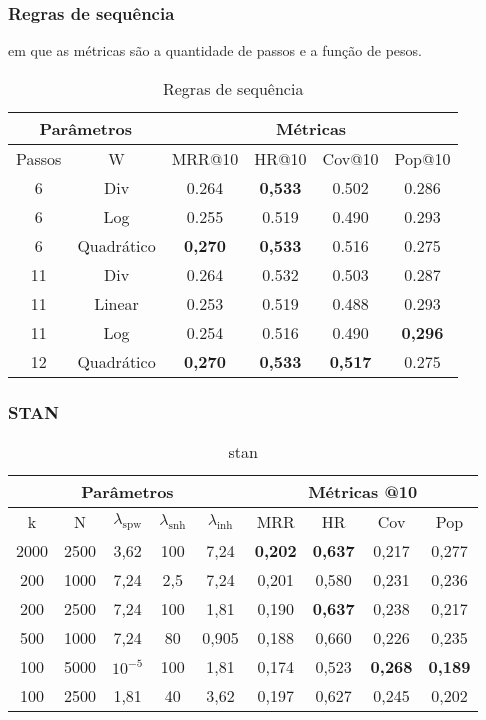 \subsubsection{Regras de sequência}
em que as métricas são a quantidade de passos e a função de pesos.
\begin{table}[htbp]
    \centering
    \begin{tabular}{|c|c|c|c|c|c|}
        \hline
        \multicolumn{2}{|c|}{Parâmetros} & \multicolumn{4}{c|}{Métricas} \\
        \hline
        Passos & W & MRR@10 & HR@10 & Cov@10 & Pop@10 \\
        \hline
        6 & Div & 0.264 & \textbf{0,533} & 0.502 & 0.286 \\
        \hline
        6 & Log & 0.255 & 0.519 & 0.490 & 0.293 \\
        \hline
        6 & Quadrático & \textbf{0,270} & \textbf{0,533} & 0.516 & 0.275 \\
        \hline
        11 & Div & 0.264 & 0.532 & 0.503 & 0.287 \\
        \hline
        11 & Linear & 0.253 & 0.519 & 0.488 & 0.293 \\
        \hline
        11 & Log & 0.254 & 0.516 & 0.490 & \textbf{0,296} \\
        \hline
        12 & Quadrático & \textbf{0,270} & \textbf{0,533} & \textbf{0,517} & 0.275 \\
        \hline
        \end{tabular}
    \caption{Regras de sequência}
\end{table}


\subsubsection{STAN}
\begin{table}[htbp]
    \centering
    \begin{tabular}{|c|c|c|c|c|c|c|c|c|}
      \hline
      \multicolumn{5}{|c|}{Parâmetros} & \multicolumn{4}{c|}{Métricas @10} \\
      \hline
      k & N & $\lambda_{\text{spw}}$ & $\lambda_{\text{snh}}$ & $\lambda_{\text{inh}}$ & MRR & HR & Cov & Pop \\
      \hline
      2000 & 2500 & 3,62 & 100 & 7,24 & \textbf{0,202} & \textbf{0,637} & 0,217 & 0,277 \\
      \hline
      200 & 1000 & 7,24 & 2,5 & 7,24 & 0,201 & 0,580 & 0,231 & 0,236 \\
      \hline
      200 & 2500 & 7,24 & 100 & 1,81& 0,190 & \textbf{0,637} & 0,238 & 0,217 \\
      \hline
      500 & 1000 & 7,24 & 80 & 0,905 & 0,188 & 0,660 & 0,226 & 0,235 \\
      \hline
      100 & 5000 & $10^{-5}$ & 100 & 1,81 & 0,174 & 0,523 & \textbf{0,268} & \textbf{0,189} \\
      \hline
      100 & 2500 & 1,81 & 40 & 3,62 & 0,197 & 0,627 & 0,245 & 0,202 \\
      \hline

    \end{tabular}
    \caption{stan}
  \end{table}


